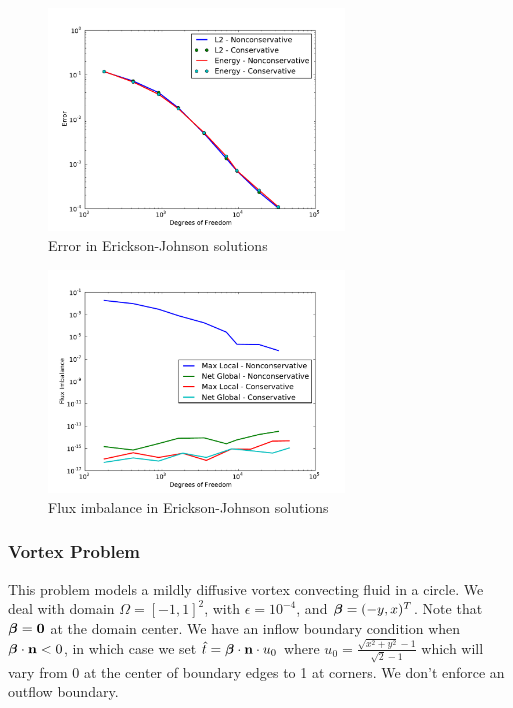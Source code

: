 \documentclass[Proposal.tex]{subfiles}
\begin{document}
\begin{figure}[p]
\centering
\includegraphics[width=0.7\textwidth]{figs/Erickson/modifiedError.pdf}
\caption{Error in Erickson-Johnson solutions}
\label{fig:ericksonError}
\end{figure}

\begin{figure}[h!]
\centering
\includegraphics[width=0.7\textwidth]{figs/Erickson/modifiedFlux.pdf}
\caption{Flux imbalance in Erickson-Johnson solutions}
\label{ericksonFlux}
\end{figure}

\subsubsection{Vortex Problem}
This problem models a mildly diffusive vortex convecting fluid in a circle. We
deal with domain $\Omega=[-1,1]^2$, with $\epsilon=10^{-4}$, and
$\boldsymbol\beta=(-y,x)^T$. Note that $\boldsymbol\beta=\mathbf{0}$ at the domain center. We have an
inflow boundary condition when $\boldsymbol\beta\cdot\mathbf{n}<0$, in which case we set
$\hat t=\boldsymbol\beta\cdot\mathbf{n}\cdot u_0$ where
$u_0=\frac{\sqrt{x^2+y^2}-1}{\sqrt{2}-1}$ which will vary from 0 at the center
of boundary edges to 1 at corners. We don't enforce an outflow boundary.
\end{document}
